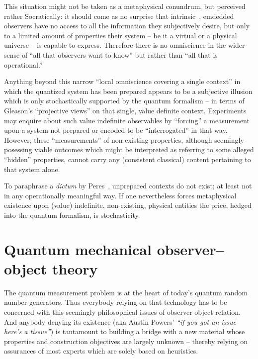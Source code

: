 This situation might not be taken as a metaphysical conundrum, but perceived rather Socratically:
it should come as no surprise that intrinsic~\cite{svozil-94}, emdedded~\cite{toffoli:79}
observers have no access to
all the information they subjectively desire, but only to a limited amount of properties
their system -- be it a virtual or a physical universe -- is capable to express.
Therefore there is no omniscience in the wider sense of ``all that observers want to know''
but rather than ``all that is operational.''

Anything beyond this narrow ``local omniscience covering a single context''
in which the quantized system has been prepared
appears to be a subjective illusion which is only stochastically  supported by the quantum formalism --
in terms of Gleason's ``projective views'' on that single, value definite context.
Experiments may enquire about such value indefinite observables by ``forcing'' a measurement upon
a system not prepared or encoded to be ``interrogated'' in that way.
However,  these ``measurements'' of non-existing properties,
although seemingly posessing viable outcomes
which might be interpreted as referring to some alleged ``hidden'' properties,
cannot carry any (consistent classical) content pertaining to that system alone.

To paraphrase a {\it dictum} by Peres~\cite{peres222}, unprepared contexts do not exist;
at least not in any operationally meaningful way.
If one nevertheless forces metaphysical existence upon (value) indefinite, non-existing, physical entities
the price, hedged into the quantum formalism, is stochasticity.





\section{Quantum mechanical observer--object theory}
\label{2016-pu-book-chapter-qm-oot}

The quantum measurement problem is at the heart of today's quantum random number generators.
Thus everybody relying on that technology has to be concerned with this seemingly philosophical issues
of observer-object relation.
And anybody denying its existence (aka  Austin Powers' {\em ``if you got an issue here's a tissue''})
is tantamount to building a bridge with a new material whose properties
and construction objectives are largely unknown -- thereby relying on assurances of most experts which are solely based on heuristics.

